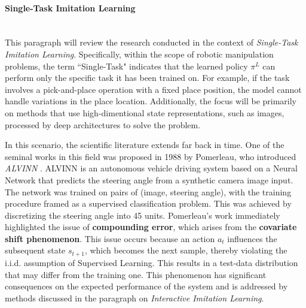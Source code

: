 \paragraph*{Single-Task Imitation Learning}\mbox{}\\
This paragraph will review the research conducted in the context of \textit{ Single-Task Imitation Learning}. Specifically, within the scope of robotic manipulation problems, the term ``Single-Task" indicates that the learned policy $\pi^{L}$ can perform only the specific task it has been trained on. For example, if the task involves a pick-and-place operation with a fixed place position, the model cannot handle variations in the place location. Additionally, the focus will be primarily on methods that use high-dimentional state representations, such as images, processed by deep architectures to solve the problem.

In this scenario, the scientific literature extends far back in time. One of the seminal works in this field was proposed in 1988 by Pomerleau, who introduced \textit{ALVINN} \cite{pomerleau1988alvinn}. ALVINN is an autonomous vehicle driving system based on a Neural Network that predicts the steering angle from a synthetic camera image input. The network was trained on pairs of (image, steering angle), with the training procedure framed as a supervised classification problem. This was achieved by discretizing the steering angle into 45 units. Pomerleau's work immediately highlighted the issue of \textbf{compounding error}, which arises from the \textbf{covariate shift phenomenon}. This issue occurs because an action $a_{t}$ influences the subsequent state $s_{t+1}$, which becomes the next sample, thereby violating the i.i.d. assumption of Supervised Learning. This results in a test-data distribution that may differ from the training one. This phenomenon has significant consequences on the expected performance of the system and is addressed by methods discussed in the paragraph on \textit{Interactive Imitation Learning}.

